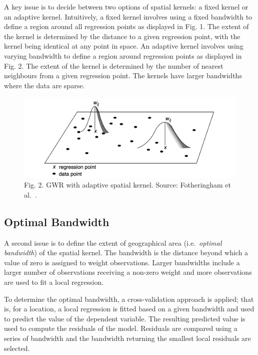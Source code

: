 \documentclass[
]{book}
\begin{document}
A key issue is to decide between two options of spatial kernels: a fixed kernel or an adaptive kernel. Intuitively, a fixed kernel involves using a fixed bandwidth to define a region around all regression points as displayed in Fig. 1. The extent of the kernel is determined by the distance to a given regression point, with the kernel being identical at any point in space. An adaptive kernel involves using varying bandwidth to define a region around regression points as displayed in Fig. 2. The extent of the kernel is determined by the number of nearest neighbours from a given regression point. The kernels have larger bandwidths where the data are sparse.

\begin{figure}
\centering
\includegraphics{figs/ch8/adaptive_bandwidth.png}
\caption{Fig. 2. GWR with adaptive spatial kernel. Source: Fotheringham et al.~\citeyearpar[p.47]{Fotheringham_et_al_2002_book}.}
\end{figure}

\hypertarget{optimal-bandwidth}{%
\subsection{Optimal Bandwidth}\label{optimal-bandwidth}}

A second issue is to define the extent of geographical area (i.e.~\emph{optimal bandwidth}) of the spatial kernel. The bandwidth is the distance beyond which a value of zero is assigned to weight observations. Larger bandwidths include a larger number of observations receiving a non-zero weight and more observations are used to fit a local regression.

To determine the optimal bandwidth, a cross-validation approach is applied; that is, for a location, a local regression is fitted based on a given bandwidth and used to predict the value of the dependent variable. The resulting predicted value is used to compute the residuals of the model. Residuals are compared using a series of bandwidth and the bandwidth returning the smallest local residuals are selected.
\end{document}
